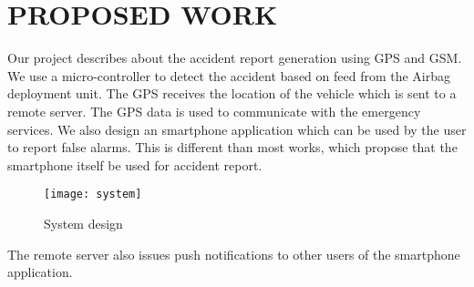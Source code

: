 
\chapter{PROPOSED WORK} %

Our project describes about the accident report generation using GPS and GSM. We use a micro-controller to detect the accident based on feed from the Airbag deployment unit. The GPS receives the location of the vehicle which is sent to a remote server. The GPS data is used to communicate with the emergency services. We also design an smartphone application which can be used by the user to report false alarms. This is different than most works, which propose that the smartphone itself be used for accident report. 

\begin{figure}[h!]
	\centering
	\texttt{[image: system]}
	\caption{System design}
	\label{fig:system}
\end{figure}

The remote server also issues push notifications to other users of the smartphone application. 